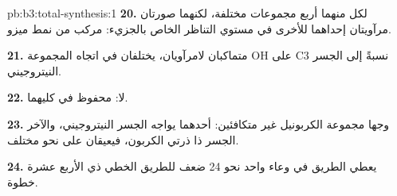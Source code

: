 \begin{solution}{pb:b3:total-synthesis:1}
\textbf{20.} لكل منهما أربع مجموعات مختلفة، لكنهما صورتان مرآويتان إحداهما للأخرى في
مستوي التناظر الخاص بالجزيء: مركب من نمط ميزو.

\textbf{21.} متماكبان لامرآويان، يختلفان في اتجاه المجموعة OH على C3 نسبةً إلى
الجسر النيتروجيني.

\textbf{22.} لا:  محفوظ في كليهما.

\textbf{23.} وجها مجموعة الكربونيل غير متكافئين: أحدهما يواجه
الجسر النيتروجيني، والآخر الجسر ذا ذرتي الكربون، فيعيقان على نحو مختلف.

\textbf{24.} يعطي الطريق في وعاء واحد نحو 24 ضعف  للطريق الخطي ذي
الأربع عشرة خطوة.
\end{solution}

